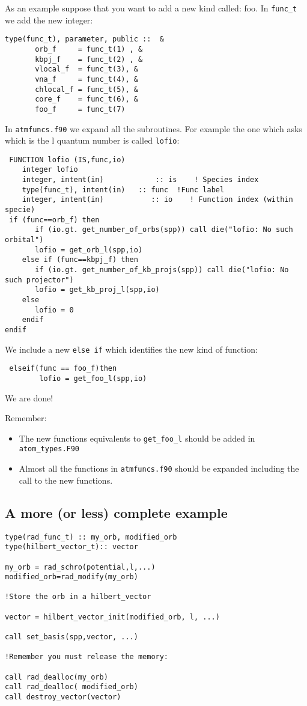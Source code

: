 \documentclass[12pt]{article}
\begin{document}
As an example suppose that you want to add a new kind called: foo. In \verb!func_t! we add
the new integer:

\begin{verbatim}
type(func_t), parameter, public ::  &
       orb_f     = func_t(1) , &
       kbpj_f    = func_t(2) , &
       vlocal_f  = func_t(3), &
       vna_f     = func_t(4), &
       chlocal_f = func_t(5), &
       core_f    = func_t(6), &
       foo_f     = func_t(7) 
\end{verbatim}

In \verb!atmfuncs.f90! we expand all the subroutines.  For example the one which asks which is the l quantum number  is called \verb!lofio!: 

\begin{verbatim}
 FUNCTION lofio (IS,func,io)
    integer lofio
    integer, intent(in)            :: is    ! Species index
    type(func_t), intent(in)   :: func  !Func label
    integer, intent(in)           :: io    ! Function index (within specie)
 if (func==orb_f) then
       if (io.gt. get_number_of_orbs(spp)) call die("lofio: No such orbital")
       lofio = get_orb_l(spp,io)
    else if (func==kbpj_f) then
       if (io.gt. get_number_of_kb_projs(spp)) call die("lofio: No such projector")
       lofio = get_kb_proj_l(spp,io)
    else
       lofio = 0
    endif
endif
\end{verbatim}

We include a new \verb!else if! which identifies the new kind of function:

\begin{verbatim}
 elseif(func == foo_f)then
        lofio = get_foo_l(spp,io)
 \end{verbatim}

We are done!
 
Remember: 
\begin{itemize}
\item The new functions equivalents to \verb!get_foo_l! should be added in \verb!atom_types.F90! 
\item  Almost all the functions in \verb!atmfuncs.f90! should be expanded including the call to the new
functions.
\end{itemize}

\subsection{A more (or less) complete example}

\begin{verbatim}
type(rad_func_t) :: my_orb, modified_orb
type(hilbert_vector_t):: vector

my_orb = rad_schro(potential,l,...)
modified_orb=rad_modify(my_orb)

!Store the orb in a hilbert_vector

vector = hilbert_vector_init(modified_orb, l, ...)

call set_basis(spp,vector, ...)

!Remember you must release the memory:

call rad_dealloc(my_orb)
call rad_dealloc( modified_orb)
call destroy_vector(vector)
\end{verbatim}
\end{document}
